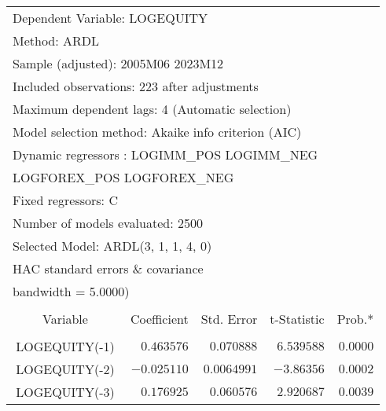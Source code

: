 \begin{tabular}{lrrrr}
\multicolumn{3}{l}{Dependent Variable: LOGEQUITY}&\multicolumn{1}{c}{}&\multicolumn{1}{c}{}\\
\multicolumn{1}{l}{Method: ARDL}&\multicolumn{1}{c}{}&\multicolumn{1}{c}{}&\multicolumn{1}{c}{}&\multicolumn{1}{c}{}\\
\multicolumn{3}{l}{Sample (adjusted): 2005M06 2023M12}&\multicolumn{1}{c}{}&\multicolumn{1}{c}{}\\
\multicolumn{4}{l}{Included observations: 223 after adjustments}&\multicolumn{1}{c}{}\\
\multicolumn{4}{l}{Maximum dependent lags: 4 (Automatic selection)}&\multicolumn{1}{c}{}\\
\multicolumn{4}{l}{Model selection method: Akaike info criterion (AIC)}&\multicolumn{1}{c}{}\\
\multicolumn{4}{l}{Dynamic regressors : LOGIMM\_POS LOGIMM\_NEG}\\
\multicolumn{3}{l}{LOGFOREX\_POS LOGFOREX\_NEG}&\multicolumn{1}{c}{}&\multicolumn{1}{c}{}\\
\multicolumn{1}{l}{Fixed regressors: C}&\multicolumn{1}{c}{}&\multicolumn{1}{c}{}&\multicolumn{1}{c}{}&\multicolumn{1}{c}{}\\
\multicolumn{3}{l}{Number of models evaluated: 2500}&\multicolumn{1}{c}{}&\multicolumn{1}{c}{}\\
\multicolumn{3}{l}{Selected Model: ARDL(3, 1, 1, 4, 0)}&\multicolumn{1}{c}{}&\multicolumn{1}{c}{}\\
\multicolumn{6}{l}{HAC standard errors \& covariance}\\
\multicolumn{2}{l}{bandwidth = 5.0000)}&\multicolumn{1}{c}{}&\multicolumn{1}{c}{}&\multicolumn{1}{c}{}\\
[4.5pt] \hline \\ [-4.5pt]
\multicolumn{1}{c}{Variable}&\multicolumn{1}{r}{Coefficient}&\multicolumn{1}{r}{Std. Error}&\multicolumn{1}{r}{t-Statistic}&\multicolumn{1}{r}{Prob.*}\\
[4.5pt] \hline \\ [-4.5pt]
\multicolumn{1}{c}{LOGEQUITY(-1)}&\multicolumn{1}{r}{$0.463576$}&\multicolumn{1}{r}{$0.070888$}&\multicolumn{1}{r}{$6.539588$}&\multicolumn{1}{r}{$0.0000$}\\
\multicolumn{1}{c}{LOGEQUITY(-2)}&\multicolumn{1}{r}{$-0.025110$}&\multicolumn{1}{r}{$0.0064991$}&\multicolumn{1}{r}{$-3.86356$}&\multicolumn{1}{r}{$0.0002$}\\
\multicolumn{1}{c}{LOGEQUITY(-3)}&\multicolumn{1}{r}{$0.176925$}&\multicolumn{1}{r}{$0.060576$}&\multicolumn{1}{r}{$2.920687$}&\multicolumn{1}{r}{$0.0039$}\\

\end{tabular}
